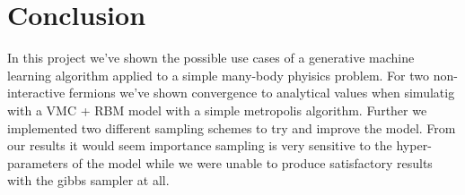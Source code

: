 \section{Conclusion}
In this project we've shown the possible use cases of a generative machine learning algorithm applied to a simple many-body phyisics problem. For two non-interactive fermions we've shown convergence to analytical values when simulatig with a VMC + RBM model with a simple metropolis algorithm. Further  we implemented two different sampling schemes to try and improve the model. From our results it would seem importance sampling is very sensitive to the hyper-parameters of the model while we were unable to produce satisfactory results with the gibbs sampler at all. 